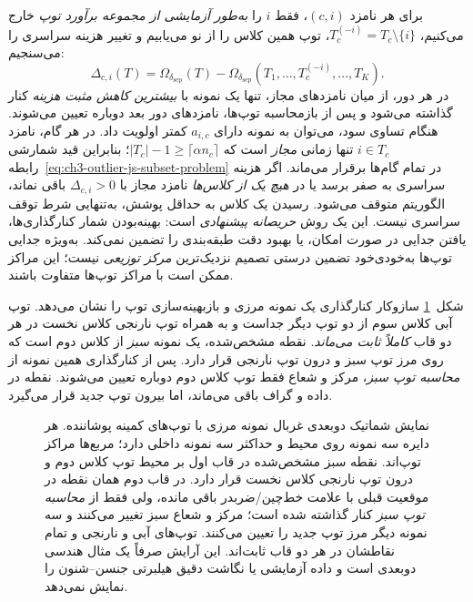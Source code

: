 برای هر نامزد $(c,i)$،
فقط $i$ را \emph{به‌طور آزمایشی
از مجموعه برآورد توپ} خارج می‌کنیم،
$T_c^{(-i)}=T_c\setminus\{i\}$،
توپ همین کلاس را از نو می‌یابیم
و تغییر هزینه سراسری را می‌سنجیم:
\begin{equation}\label{eq:ch3-outlier-js-greedy-gain}
\boxed{
\Delta_{c,i}(T)=
\Omega_{\delta_{\mathrm{sep}}}(T)
-\Omega_{\delta_{\mathrm{sep}}}
(T_1,\ldots,T_c^{(-i)},\ldots,T_K).
}
\end{equation}
در هر دور، از میان نامزدهای
مجاز، تنها یک نمونه با
\emph{بیشترین کاهش مثبت هزینه}
کنار گذاشته می‌شود و پس از
بازمحاسبه توپ‌ها، نامزدهای
دور بعد دوباره تعیین می‌شوند.
هنگام تساوی سود، می‌توان
به نمونه دارای $a_{i,c}$
کمتر اولویت داد. در هر گام، نامزد
$i\in T_c$ تنها زمانی
\emph{مجاز} است که
$|T_c|-1\ge
\lceil\alpha n_c\rceil$؛
بنابراین قید شمارشی
رابطه~\eqref{eq:ch3-outlier-js-subset-problem}
در تمام گام‌ها برقرار
می‌ماند. اگر هزینه سراسری
به صفر برسد یا در \emph{هیچ
یک از کلاس‌ها} نامزد مجاز
با $\Delta_{c,i}>0$ باقی
نماند، الگوریتم متوقف می‌شود.
رسیدن یک کلاس به حداقل
پوشش، به‌تنهایی شرط توقف
سراسری نیست.
این یک روش \emph{حریصانه پیشنهادی}
است: بهینه‌بودن شمار کنارگذاری‌ها،
یافتن جدایی در صورت امکان، یا
بهبود دقت طبقه‌بندی را تضمین
نمی‌کند. به‌ویژه جدایی توپ‌ها
به‌خودی‌خود تضمین درستی تصمیم
نزدیک‌ترین \emph{مرکز توزیعی}
نیست؛ این مراکز ممکن است با
مراکز توپ‌ها متفاوت باشند.

شکل~\ref{fig:ch3-js-overlap-boundary-screening}
سازوکار کنارگذاری یک نمونه مرزی
و بازبهینه‌سازی توپ را نشان می‌دهد.
توپ آبی کلاس سوم از دو توپ دیگر
جداست و به همراه توپ نارنجی کلاس نخست
در هر دو قاب \emph{کاملاً ثابت می‌ماند}.
نقطه مشخص‌شده، یک نمونه \emph{سبز}
از کلاس دوم است که روی مرز توپ سبز
و درون توپ نارنجی قرار دارد.
پس از کنارگذاری همین نمونه از
\emph{محاسبه توپ سبز}، مرکز و شعاع
فقط توپ کلاس دوم دوباره تعیین می‌شوند.
نقطه در داده و گراف باقی می‌ماند،
اما بیرون توپ جدید قرار می‌گیرد.

\begin{figure}[htbp]
\centering
\resizebox{0.98\linewidth}{!}{%
%
}
\caption{نمایش شماتیک دوبعدی غربال نمونه مرزی با توپ‌های کمینه پوشاننده. هر دایره سه نمونه روی محیط و حداکثر سه نمونه داخلی دارد؛ مربع‌ها مراکز توپ‌اند. نقطه سبز مشخص‌شده در قاب اول بر محیط توپ کلاس دوم و درون توپ نارنجی کلاس نخست قرار دارد. در قاب دوم همان نقطه در موقعیت قبلی با علامت خط‌چین/ضربدر باقی مانده، ولی فقط از \emph{محاسبه توپ سبز} کنار گذاشته شده است؛ مرکز و شعاع سبز تغییر می‌کنند و سه نمونه دیگر مرز توپ جدید را تعیین می‌کنند. توپ‌های آبی و نارنجی و تمام نقاطشان در هر دو قاب ثابت‌اند. این آرایش صرفاً یک مثال هندسی دوبعدی است و داده آزمایشی یا نگاشت دقیق هیلبرتی جنسن--شنون را نمایش نمی‌دهد.}
\label{fig:ch3-js-overlap-boundary-screening}
\end{figure}

